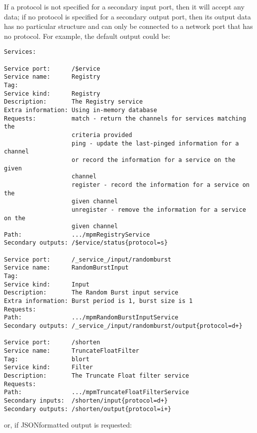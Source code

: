 If a protocol is not specified for a secondary input port, then it will accept any data;
if no protocol is specified for a secondary output port, then its output data has no
particular structure and can only be connected to a \yarp{} network port that has no
protocol.
\condPage{}
For example, the default output could be:
\outputBegin
\begin{verbatim}
Services:

Service port:      /$ervice
Service name:      Registry
Tag:
Service kind:      Registry
Description:       The Registry service
Extra information: Using in-memory database
Requests:          match - return the channels for services matching the
                   criteria provided
                   ping - update the last-pinged information for a channel
                   or record the information for a service on the given
                   channel
                   register - record the information for a service on the
                   given channel
                   unregister - remove the information for a service on the
                   given channel
Path:              .../mpmRegistryService
Secondary outputs: /$ervice/status{protocol=s}

Service port:      /_service_/input/randomburst
Service name:      RandomBurstInput
Tag:
Service kind:      Input
Description:       The Random Burst input service
Extra information: Burst period is 1, burst size is 1
Requests:
Path:              .../mpmRandomBurstInputService
Secondary outputs: /_service_/input/randomburst/output{protocol=d+}

Service port:      /shorten
Service name:      TruncateFloatFilter
Tag:               blort
Service kind:      Filter
Description:       The Truncate Float filter service
Requests:
Path:              .../mpmTruncateFloatFilterService
Secondary inputs:  /shorten/input{protocol=d+}
Secondary outputs: /shorten/output{protocol=i+}
\end{verbatim}
\outputEnd
\condPage{}
or, if JSON\longDash{}formatted output is requested:
\outputBegin
